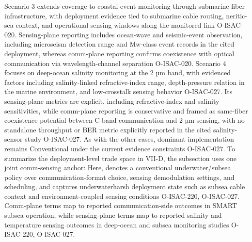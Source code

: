 {}Scenario 3 extends coverage to coastal-event monitoring through submarine-fiber infrastructure, with deployment evidence tied to submarine cable routing, neritic-sea context, and operational sensing windows along the monitored link O-ISAC-020. Sensing-plane reporting includes ocean-wave and seismic-event observation, including microseism detection range and Mw-class event records in the cited deployment, whereas comm-plane reporting confirms coexistence with optical communication via wavelength-channel separation O-ISAC-020.\markdownRendererParagraphSeparator
{}Scenario 4 focuses on deep-ocean salinity monitoring at the 2 µm band, with evidenced factors including salinity-linked refractive-index range, depth-pressure relation in the marine environment, and low-crosstalk sensing behavior O-ISAC-027. Its sensing-plane metrics are explicit, including refractive-index and salinity sensitivities, while comm-plane reporting is conservative and framed as same-fiber coexistence potential between C-band communication and 2 µm sensing, with no standalone throughput or BER metric explicitly reported in the cited salinity-sensor study O-ISAC-027. As with the other cases, dominant implementation remains Conventional under the current evidence constraints O-ISAC-027.\markdownRendererInterblockSeparator
{}
\markdownRendererSectionEnd \markdownRendererSectionBegin
{}\markdownRendererInterblockSeparator
{}To summarize the deployment-level trade space in VII-D, the subsection uses one joint comm-sensing anchor:\markdownRendererParagraphSeparator
{}\markdownRendererSoftLineBreak
{}\markdownRendererParagraphSeparator
{}Here,  denotes a conventional underwater/subsea policy over communication-format choice, sensing demodulation settings, and scheduling, and  captures underwater\markdownRendererUnderscore{}harsh deployment state such as subsea cable context and environment-coupled sensing conditions O-ISAC-220, O-ISAC-027. Comm-plane terms map to reported communication-side outcomes in SMART subsea operation, while sensing-plane terms map to reported salinity and temperature sensing outcomes in deep-ocean and subsea monitoring studies O-ISAC-220, O-ISAC-027.\markdownRendererParagraphSeparator
